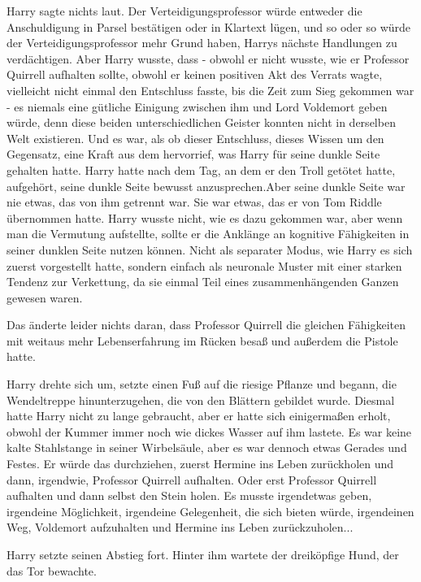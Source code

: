 Harry sagte nichts laut. Der Verteidigungsprofessor würde entweder die
Anschuldigung in Parsel bestätigen oder in Klartext lügen, und so oder so würde
der Verteidigungsprofessor mehr Grund haben, Harrys nächste Handlungen zu
verdächtigen. Aber Harry wusste, dass - obwohl er nicht wusste, wie er Professor
Quirrell aufhalten sollte, obwohl er keinen positiven Akt des Verrats wagte,
vielleicht nicht einmal den Entschluss fasste, bis die Zeit zum Sieg gekommen
war - es niemals eine gütliche Einigung zwischen ihm und Lord Voldemort geben
würde, denn diese beiden unterschiedlichen Geister konnten nicht in derselben
Welt existieren. Und es war, als ob dieser Entschluss, dieses Wissen um den
Gegensatz, eine Kraft aus dem hervorrief, was Harry für seine dunkle Seite
gehalten hatte. Harry hatte nach dem Tag, an dem er den Troll getötet hatte,
aufgehört, seine dunkle Seite bewusst anzusprechen.Aber seine dunkle Seite war
nie etwas, das von ihm getrennt war. Sie war etwas, das er von Tom Riddle
übernommen hatte. Harry wusste nicht, wie es dazu gekommen war, aber wenn man
die Vermutung aufstellte, sollte er die Anklänge an kognitive Fähigkeiten in
seiner dunklen Seite nutzen können. Nicht als separater Modus, wie Harry es sich
zuerst vorgestellt hatte, sondern einfach als neuronale Muster mit einer starken
Tendenz zur Verkettung, da sie einmal Teil eines zusammenhängenden Ganzen
gewesen waren.

Das änderte leider nichts daran, dass Professor Quirrell die gleichen
Fähigkeiten mit weitaus mehr Lebenserfahrung im Rücken besaß und außerdem die
Pistole hatte.

Harry drehte sich um, setzte einen Fuß auf die riesige Pflanze und begann, die
Wendeltreppe hinunterzugehen, die von den Blättern gebildet wurde. Diesmal hatte
Harry nicht zu lange gebraucht, aber er hatte sich einigermaßen erholt, obwohl
der Kummer immer noch wie dickes Wasser auf ihm lastete. Es war keine kalte
Stahlstange in seiner Wirbelsäule, aber es war dennoch etwas Gerades und Festes.
Er würde das durchziehen, zuerst Hermine ins Leben zurückholen und dann,
irgendwie, Professor Quirrell aufhalten. Oder erst Professor Quirrell aufhalten
und dann selbst den Stein holen. Es musste irgendetwas geben, irgendeine
Möglichkeit, irgendeine Gelegenheit, die sich bieten würde, irgendeinen Weg,
Voldemort aufzuhalten und Hermine ins Leben zurückzuholen...

Harry setzte seinen Abstieg fort. Hinter ihm wartete der dreiköpfige Hund, der
das Tor bewachte.

